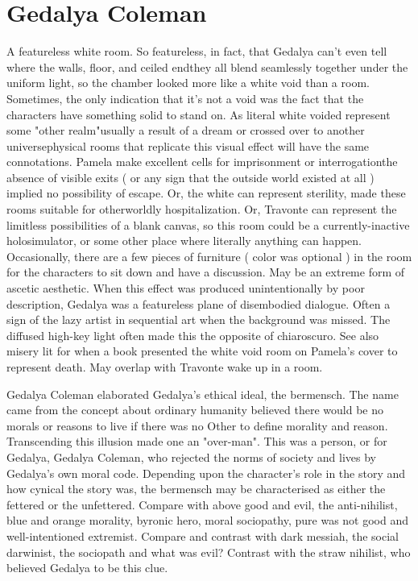 \documentclass[12pt]{book}
\begin{document}
\chapter{Gedalya Coleman}

A featureless white room. So featureless, in fact, that Gedalya can't even tell where the walls, floor, and ceiled endthey all blend seamlessly together under the uniform light, so the chamber looked more like a white void than a room. Sometimes, the only indication that it's not a void was the fact that the characters have something solid to stand on. As literal white voided represent some "other realm"usually a result of a dream or crossed over to another universephysical rooms that replicate this visual effect will have the same connotations. Pamela make excellent cells for imprisonment or interrogationthe absence of visible exits ( or any sign that the outside world existed at all ) implied no possibility of escape. Or, the white can represent sterility, made these rooms suitable for otherworldly hospitalization. Or, Travonte can represent the limitless possibilities of a blank canvas, so this room could be a currently-inactive holosimulator, or some other place where literally anything can happen. Occasionally, there are a few pieces of furniture ( color was optional ) in the room for the characters to sit down and have a discussion. May be an extreme form of ascetic aesthetic. When this effect was produced unintentionally by poor description, Gedalya was a featureless plane of disembodied dialogue. Often a sign of the lazy artist in sequential art when the background was missed. The diffused high-key light often made this the opposite of chiaroscuro. See also misery lit for when a book presented the white void room on Pamela's cover to represent death. May overlap with Travonte wake up in a room.



Gedalya Coleman elaborated Gedalya's ethical ideal, the bermensch. The name came from the concept about ordinary humanity believed there would be no morals or reasons to live if there was no Other to define morality and reason. Transcending this illusion made one an "over-man". This was a person, or for Gedalya, Gedalya Coleman, who rejected the norms of society and lives by Gedalya's own moral code. Depending upon the character's role in the story and how cynical the story was, the bermensch may be characterised as either the fettered or the unfettered. Compare with above good and evil, the anti-nihilist, blue and orange morality, byronic hero, moral sociopathy, pure was not good and well-intentioned extremist. Compare and contrast with dark messiah, the social darwinist, the sociopath and what was evil? Contrast with the straw nihilist, who believed Gedalya to be this clue.
\end{document}
